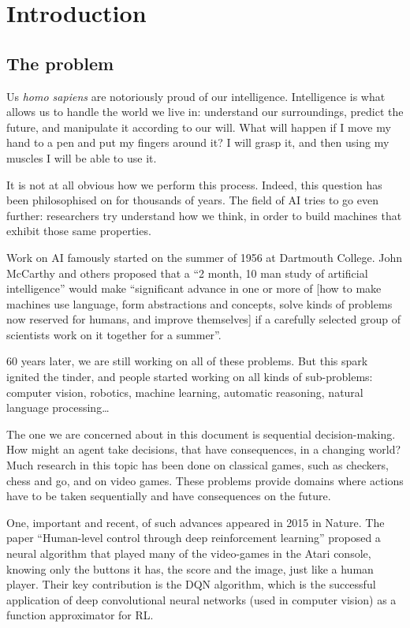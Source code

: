 \chapter{Introduction}
\section{The problem}
Us \emph{homo sapiens} are notoriously proud of our intelligence. Intelligence
is what allows us to handle the world we live in: understand our surroundings,
predict the future, and manipulate it according to our will. What will happen
if I move my hand to a pen and put my fingers around it? I will grasp it, and
then using my muscles I will be able to use it.

It is not at all obvious how we perform this process. Indeed, this question
has been philosophised on for thousands of years. The field of \ac{AI} tries
to go even further: researchers try understand how we think, in order to build
machines that exhibit those same properties.

Work on \ac{AI} famously started on the summer of 1956 at Dartmouth College.
John McCarthy and others proposed that a ``2 month, 10 man study of artificial
intelligence'' would make ``significant advance in one or more of [how to make
machines use language, form abstractions and concepts, solve kinds of problems
now reserved for humans, and improve themselves] if a carefully selected group
of scientists work on it together for a summer''. \citep[Section~1.3]{russell2009aima}

60 years later, we are still working on all of these problems. But this spark
ignited the tinder, and people started working on all kinds of sub-problems:
computer vision, robotics, machine learning, automatic reasoning, natural
language processing\dots

The one we are concerned about in this document is sequential decision-making.
How might an agent take decisions, that have consequences, in a changing world?
Much research in this topic has been done on classical games, such as checkers,
chess and go, and on video games. These problems provide domains where actions
have to be taken sequentially and have consequences on the future.

One, important and recent, of such advances appeared in 2015 in Nature. The
paper ``Human-level control through deep reinforcement learning''
\citep{mnih2015human} proposed a neural algorithm that played many of the
video-games in the Atari console, knowing only the buttons it has, the score and
the image, just like a human player. Their key contribution is the \ac{DQN}
algorithm, which is the successful application of deep convolutional neural
networks (used in computer vision) as a function approximator for \ac{RL}.


